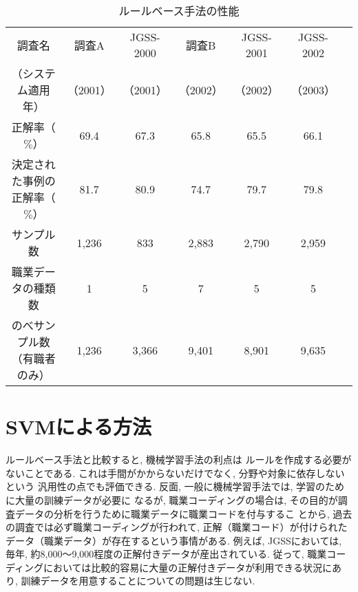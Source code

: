 \documentclass{nlp}
\begin{document}
\begin{table}
\begin{center}
\caption{ルールベース手法の性能}
\begin{tabular}{c|cccccc}
\hline\hline
調査名&調査A& JGSS-2000&調査B&JGSS-2001&JGSS-2002\\
（システム適用年）&（2001）&（2001）&（2002）&（2002）&（2003）\\
\hline
正解率（$\%$）&69.4&67.3&65.8&65.5&66.1\\
決定された事例の正解率（$\%$）&81.7&80.9&74.7&79.7&79.8\\
\hline\hline
サンプル数&1,236&833&2,883&2,790&2,959\\
職業データの種類数&1&5&7&5&5\\
のべサンプル数（有職者のみ）&1,236&3,366&9,401&8,901&9,635\\
\hline
\end{tabular}
\label{rocco}
\end{center}
\end{table}

\section{SVMによる方法}
\label{SVM}
ルールベース手法と比較すると, 
機械学習手法の利点は
ルールを作成する必要がないことである. 
これは手間がかからないだけでなく, 分野や対象に依存しないという
汎用性の点でも評価できる. 
反面, 一般に機械学習手法では, 学習のために大量の訓練データが必要に
なるが, 職業コーディングの場合は, 
その目的が調査データの分析を行うために職業データに職業コードを付与するこ
とから, 
過去の調査では必ず職業コーディングが行われて, 
正解（職業コード）が付けられたデータ（職業データ）が存在するという事情がある. 
例えば, JGSSにおいては, 毎年, 約8,000〜9,000程度の正解付きデータが産出されている. 
従って, 職業コーディングにおいては比較的容易に大量の正解付きデータが利用できる状況にあり, 
訓練データを用意することについての問題は生じない. 
\end{document}
